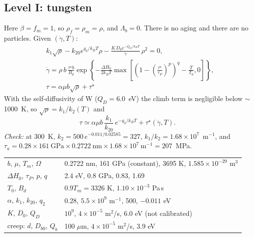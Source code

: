 \documentclass[11pt]{article}
\newcommand{\gd}{\dot\gamma}
\newcommand{\ts}{\tau^{\star}}
\newcommand{\kT}{k_BT}
\numberwithin{equation}{section}
\begin{document}
\subsection{Level I: tungsten}
\begin{matbox}
Here $\beta=f_m=1$, so $\rho_f=\rho_m=\rho$, and $\Lambda_b=0$. There is no aging and there are no particles. Given $(\gd,T)$:
\begin{align}
&k_1\sqrt\rho-k_{20}e^{q_2/\kT}\rho-\frac{K\,D_0e^{-Q_D/\kT}}{\gd}\,\rho^2=0,\\[4pt]
&\gd=\rho\,b\,\frac{\ts b}{B_d}\exp\left\{-\frac{\Delta H_0}{2\kT}\max\!\left[\left(1-\left(\frac{\ts}{\tau_P}\right)^{p}\right)^{q}-\frac{T}{T_0},0\right]\right\},\\[4pt]
&\boxed{\tau=\alpha\mu b\sqrt\rho+\ts}
\end{align}
With the self-diffusivity of W ($Q_D=6.0$~eV) the climb term is negligible below $\sim$1000~K, so $\sqrt\rho=k_1/k_2(T)$ and
\begin{equation}
\tau\simeq\alpha\mu b\,\frac{k_1}{k_{20}}\,e^{-q_2/\kT}+\ts(\gd,T).
\end{equation}
\emph{Check:} at 300~K, $k_2=500\,e^{-0.011/0.02585}=327$, $k_1/k_2=1.68\times10^7$~m$^{-1}$, and $\tau_a=0.28\times161~\text{GPa}\times0.2722~\text{nm}\times1.68\times10^7~\text{m}^{-1}=207$~MPa.

\medskip
\begin{tabular}{@{}ll@{}}
\toprule
$b$, $\mu$, $T_m$, $\Omega$ & 0.2722 nm, 161 GPa (constant), 3695 K, $1.585\times10^{-29}$ m$^3$\\
$\Delta H_0$, $\tau_P$, $p$, $q$ & 2.4 eV, 0.8 GPa, 0.83, 1.69\\
$T_0$, $B_d$ & $0.9T_m=3326$ K, $1.10\times10^{-3}$ Pa\,s\\
$\alpha$, $k_1$, $k_{20}$, $q_2$ & 0.28, $5.5\times10^9$ m$^{-1}$, 500, $-0.011$ eV\\
$K$, $D_0$, $Q_D$ & $10^9$, $4\times10^{-5}$ m$^2$/s, 6.0 eV (not calibrated)\\
creep: $d$, $D_{b0}$, $Q_b$ & 100 $\mu$m, $4\times10^{-5}$ m$^2$/s, 3.9 eV\\
\bottomrule
\end{tabular}
\end{matbox}

\clearpage
\end{document}
